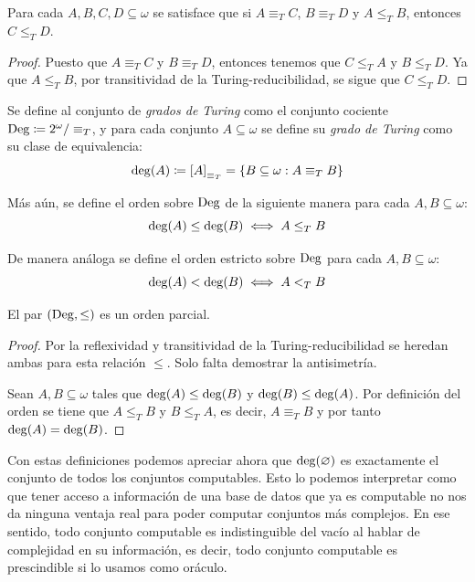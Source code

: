 \begin{agregado}
\begin{agregado}[teorema]
\begin{theorem}
	\label{theo: grados_bien_definidos}
	Para cada $A, B, C, D\subseteq\omega$ se satisface que si $A\equiv_{T} C$, $B\equiv_{T} D$ y $A\leq_{T} B$, entonces $C\leq_{T} D$.
\end{theorem}

\begin{proof}
	Puesto que $A\equiv_{T} C$ y $B\equiv_{T} D$, entonces tenemos que $C\leq_{T} A$ y $B\leq_{T} D$. Ya que $A\leq_{T} B$, por transitividad de la Turing-reducibilidad, se sigue que $C\leq_{T} D$.
\end{proof}
\end{agregado}

\begin{definition}
	\label{def: grados_de_turing}
	Se define al conjunto de \emph{grados de Turing} como el conjunto cociente $\GRADOS\coloneqq\CPOTENCIA{\omega}/\equiv_{T}$, y para cada conjunto $A\subseteq\omega$ se define su \emph{grado de Turing} como su clase de equivalencia:
	\[
		\GRADO{A}\coloneqq\bra*{A}_{\equiv_{T}} =\set*{B\subseteq\omega: A\equiv_{T} B}
	\]

	Más aún, se define el orden sobre $\GRADOS$ de la siguiente manera para cada $A, B\subseteq\omega$:
	\[
		\GRADO{A}\leq\GRADO{B}\iff A\leq_{T} B
	\]
	\begin{correccion}
	De manera análoga se define el orden estricto sobre $\GRADOS$ para cada $A, B\subseteq\omega$:
	\[
		\GRADO{A} <\GRADO{B}\iff A <_{T} B
	\]
	\end{correccion}
\end{definition}

\begin{theorem}
	El par $\pa*{\GRADOS,\leq}$ es un orden parcial.
\end{theorem}

\begin{proof}
	Por la reflexividad y transitividad de la Turing-reducibilidad se heredan ambas para esta relación $\leq$. Solo falta demostrar la antisimetría.

	Sean $A, B\subseteq\omega$ tales que $\GRADO{A}\leq\GRADO{B}$ y $\GRADO{B}\leq\GRADO{A}$. Por definición del orden se tiene que $A\leq_{T} B$ y $B\leq_{T} A$, es decir, $A\equiv_{T} B$ y por tanto $\GRADO{A} =\GRADO{B}$.
\end{proof}

Con estas definiciones podemos apreciar ahora que $\GRADO{\varnothing}$ es exactamente el conjunto de todos los conjuntos computables. Esto lo podemos interpretar como que tener acceso a información de una base de datos que ya es computable no nos da ninguna ventaja real para poder computar conjuntos más complejos. En ese sentido, todo conjunto computable es indistinguible del vacío al hablar de complejidad en su información, es decir, todo conjunto computable es prescindible si lo usamos como oráculo.


\end{agregado}
